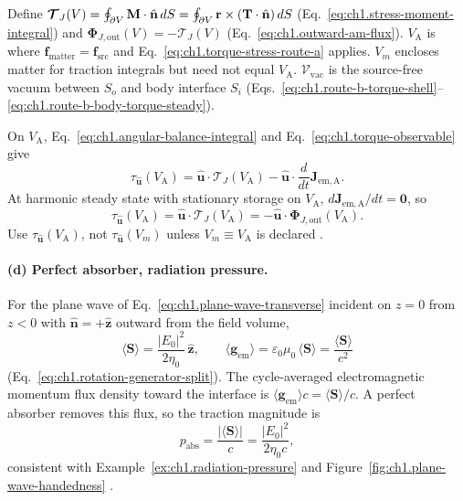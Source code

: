 Define $\boldsymbol{\mathcal{T}}_J(V)=\oint_{\partial V}\mathbf{M}\cdot\hat{\mathbf{n}}\,dS=\oint_{\partial V}\mathbf{r}\times(\mathbf{T}\cdot\hat{\mathbf{n}})\,dS$ (Eq.~\eqref{eq:ch1.stress-moment-integral}) and $\boldsymbol{\Phi}_{J,\mathrm{out}}(V)=-\boldsymbol{\mathcal{T}}_J(V)$ (Eq.~\eqref{eq:ch1.outward-am-flux}). $V_{\mathrm{A}}$ is where $\mathbf{f}_{\mathrm{matter}}=\mathbf{f}_{\mathrm{src}}$ and Eq.~\eqref{eq:ch1.torque-stress-route-a} applies. $V_m$ encloses matter for traction integrals but need not equal $V_{\mathrm{A}}$. $\mathcal{V}_{\mathrm{vac}}$ is the source-free vacuum between $S_o$ and body interface $S_i$ (Eqs.~\eqref{eq:ch1.route-b-torque-shell}--\eqref{eq:ch1.route-b-body-torque-steady}).

On $V_{\mathrm{A}}$, Eq.~\eqref{eq:ch1.angular-balance-integral} and Eq.~\eqref{eq:ch1.torque-observable} give
\[
\tau_{\hat{\mathbf{u}}}(V_{\mathrm{A}})
=\hat{\mathbf{u}}\cdot\boldsymbol{\mathcal{T}}_J(V_{\mathrm{A}})
-\hat{\mathbf{u}}\cdot\frac{d}{dt}\mathbf{J}_{\mathrm{em,A}}.
\]
At harmonic steady state with stationary storage on $V_{\mathrm{A}}$, $d\mathbf{J}_{\mathrm{em,A}}/dt=\mathbf{0}$, so
\[
\tau_{\hat{\mathbf{u}}}(V_{\mathrm{A}})=\hat{\mathbf{u}}\cdot\boldsymbol{\mathcal{T}}_J(V_{\mathrm{A}})
=-\hat{\mathbf{u}}\cdot\boldsymbol{\Phi}_{J,\mathrm{out}}(V_{\mathrm{A}}).
\]
Use $\tau_{\hat{\mathbf{u}}}(V_{\mathrm{A}})$, not $\tau_{\hat{\mathbf{u}}}(V_m)$ unless $V_m\equiv V_{\mathrm{A}}$ is declared \cite{beth1936,stratton1941}.

\paragraph{(d) Perfect absorber, radiation pressure.}
For the plane wave of Eq.~\eqref{eq:ch1.plane-wave-transverse} incident on $z=0$ from $z<0$ with $\hat{\mathbf{n}}=+\hat{\mathbf{z}}$ outward from the field volume,
\[
\langle\mathbf{S}\rangle=\frac{|E_0|^2}{2\eta_0}\,\hat{\mathbf{z}},\qquad
\langle\mathbf{g}_{\mathrm{em}}\rangle=\varepsilon_0\mu_0\,\langle\mathbf{S}\rangle
=\frac{\langle\mathbf{S}\rangle}{c^2}
\]
(Eq.~\eqref{eq:ch1.rotation-generator-split}). The cycle-averaged electromagnetic momentum flux density toward the interface is $\langle\mathbf{g}_{\mathrm{em}}\rangle c=\langle\mathbf{S}\rangle/c$. A perfect absorber removes this flux, so the traction magnitude is
\[
p_{\mathrm{abs}}=\frac{|\langle\mathbf{S}\rangle|}{c}=\frac{|E_0|^2}{2\eta_0 c},
\]
consistent with Example~\ref{ex:ch1.radiation-pressure} and Figure~\ref{fig:ch1.plane-wave-handedness} \cite{stratton1941,maxwell1873}.

